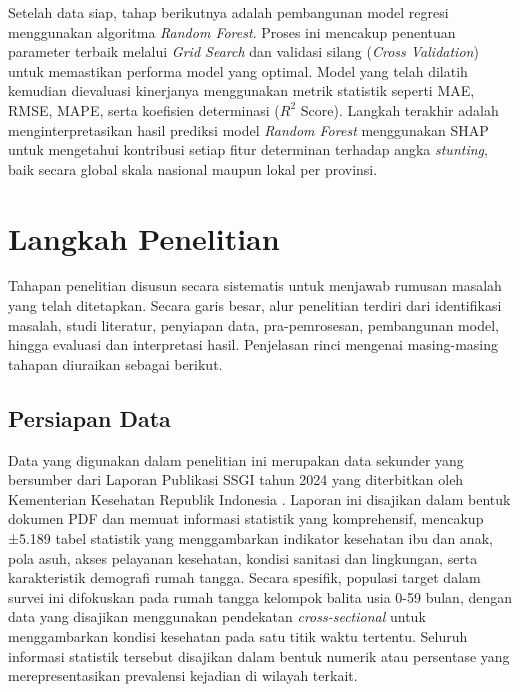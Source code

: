 Setelah data siap, tahap berikutnya adalah pembangunan model regresi menggunakan algoritma \textit{Random Forest}. Proses ini mencakup penentuan parameter terbaik melalui \textit{Grid Search} dan validasi silang (\textit{Cross Validation}) untuk memastikan performa model yang optimal. Model yang telah dilatih kemudian dievaluasi kinerjanya menggunakan metrik statistik seperti MAE, RMSE, MAPE, serta koefisien determinasi ($R^2$ Score). Langkah terakhir adalah menginterpretasikan hasil prediksi model \textit{Random Forest} menggunakan SHAP untuk mengetahui kontribusi setiap fitur determinan terhadap angka \textit{stunting}, baik secara global skala nasional maupun lokal per provinsi.

\section{Langkah Penelitian} \label{sec:langkah_penelitian}

Tahapan penelitian disusun secara sistematis untuk menjawab rumusan masalah yang telah ditetapkan. Secara garis besar, alur penelitian terdiri dari identifikasi masalah, studi literatur, penyiapan data, pra-pemrosesan, pembangunan model, hingga evaluasi dan interpretasi hasil. Penjelasan rinci mengenai masing-masing tahapan diuraikan sebagai berikut.

\subsection{Persiapan Data} \label{subsec:penyiapan}
Data yang digunakan dalam penelitian ini merupakan data sekunder yang bersumber dari Laporan Publikasi SSGI tahun 2024 yang diterbitkan oleh Kementerian Kesehatan Republik Indonesia \cite{kemenkes2025ssgi}. Laporan ini disajikan dalam bentuk dokumen PDF dan memuat informasi statistik yang komprehensif, mencakup ±5.189 tabel statistik yang menggambarkan indikator kesehatan ibu dan anak, pola asuh, akses pelayanan kesehatan, kondisi sanitasi dan lingkungan, serta karakteristik demografi rumah tangga. Secara spesifik, populasi target dalam survei ini difokuskan pada rumah tangga kelompok balita usia 0-59 bulan, dengan data yang disajikan menggunakan pendekatan \textit{cross-sectional} untuk menggambarkan kondisi kesehatan pada satu titik waktu tertentu. Seluruh informasi statistik tersebut disajikan dalam bentuk numerik atau persentase yang merepresentasikan prevalensi kejadian di wilayah terkait.

